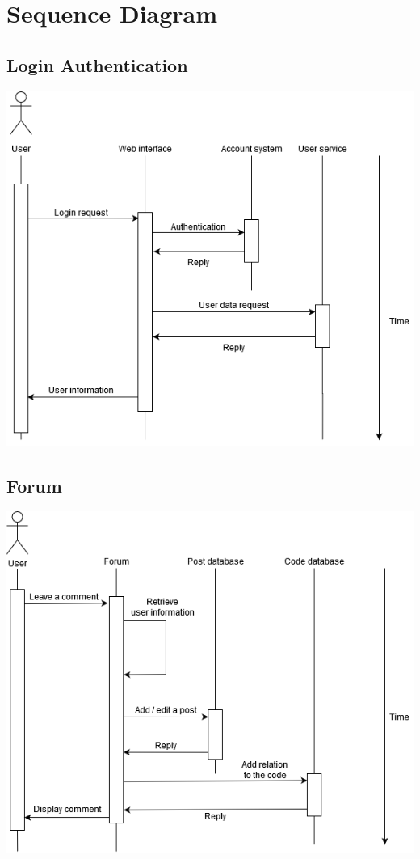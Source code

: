 \section{Sequence Diagram}
    \subsection{Login Authentication}
    \includegraphics[scale=0.5]{Doc/Graphics/seq_diagram_login}
    \subsection{Forum}
    \includegraphics[scale=0.5]{Doc/Graphics/seq_diagram_forum}
